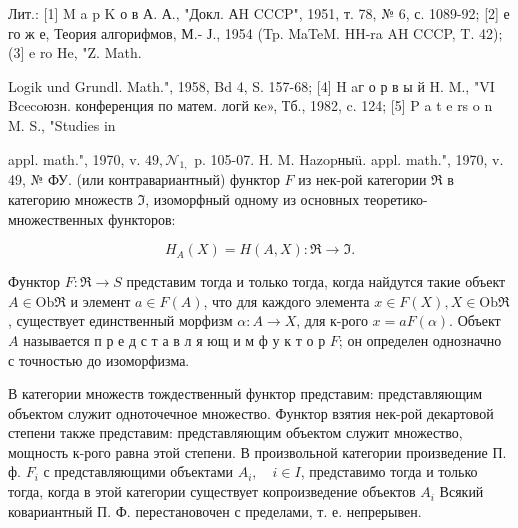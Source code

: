 \documentclass[10pt]{article}
\begin{document}
Лит.: [1] M a p K о в А. А., "Докл. АH CCCP", 1951, т. 78, № 6, с. 1089-92; [2] е го ж е, Теория алгорифмов, М.- Ј., 1954 (Tp. MaTeM. HH-ra AH CCCP, T. 42); (3] e ro He, "Z. Math.

Logik und Grundl. Math.", 1958, Bd 4, S. 157-68; [4] H aг о р в ы й H. M., "VI Bcecoюзн. конференция по матем. логй кe», Тб., 1982, c. 124; [5] P a t e rs o n M. S., "Studies in

appl. math.", 1970, v. $49, \mathcal{N}_{1,}$ p. 105-07. H. M. Hazopныü. appl. math.", 1970, v. 49, № ФУ. (или контравариантный) функтор $F$ из нек-рой категории $\mathfrak{R}$ в категорию множеств $\Im$, изоморфный одному из основных теоретико-множественных функторов:



\[

H_{A}(X)=H(A, X): \Re \rightarrow \Im .

\]



Функтор $F: \Re \rightarrow S$ представим тогда и только тогда, когда найдутся такие объект $A \in \mathrm{Ob} \mathfrak{R}$ и элемент $a \in F(A)$, что для каждого элемента $x \in F(X), X \in \mathrm{Ob} \mathfrak{\Re}$, существует единственный морфизм $\alpha: A \rightarrow X$, для к-рого $x=a F(\alpha)$. Объект $A$ называется п р е д с т а в л я ющ и м ф у к т о р $F$; он определен однозначно с точностью до изоморфизма.



В категории множеств тождественный функтор представим: представляющим объектом служит одноточечное множество. Функтор взятия нек-рой декартовой степени также представим: представляющим объектом служит множество, мощность к-рого равна этой степени. В произвольной категории произведение П. ф. $F_{i}$ с представляющими объектами $A_{i}, \quad i \in I$, представимо тогда и только тогда, когда в этой категории существует копроизведение объектов $A_{i}$ Всякий ковариантный П. Ф. перестановочен с пределами, т. е. непрерывен.
\end{document}
